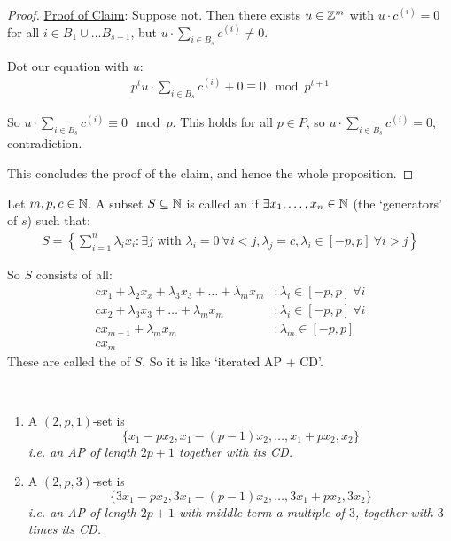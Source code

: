 \documentclass[10pt]{article}
\begin{document}
\begin{proof}
    \underline{Proof of Claim}: Suppose not. Then there exists $u \in \mathbb{Z}^m$ with $u\cdot c^{(i)} = 0$ for all $i \in B_1\cup\dots B_{s-1}$, but $u\cdot \sum_{i \in B_s}c^{(i)}\ne 0$.

    Dot our equation with $u$:
    \begin{align*}
        p^t u\cdot \sum_{i \in B_s}c^{(i)} + 0 \equiv 0\mod p^{t+1}
    \end{align*}

    So $u\cdot \sum_{i \in B_s}c^{(i)} \equiv 0 \mod p$. This holds for all $p \in P$, so $u\cdot \sum_{i \in B_s}c^{(i)} = 0$, contradiction.\qedsymbol

    This concludes the proof of the claim, and hence the whole proposition.
\end{proof}

\begin{defin*}[$(m,p,c)$-set]
    Let $m,p,c \in \mathbb{N}$. A subset $S \subseteq \mathbb{N}$ is called an  if $\exists x_1,\dots,x_n \in \mathbb{N}$ (the `generators' of $s$) such that:
    \begin{align*}
        S = \left\lbrace \sum_{i=1}^{n}\lambda_i x_i : \exists j\textrm{ with }\lambda_i = 0\ \forall i < j, \lambda _j = c, \lambda_i \in [-p,p]\ \forall i > j\right\rbrace
    \end{align*}

    So $S$ consists of all:
    \begin{align*}
        cx_1 + \lambda_2 x_x + \lambda_3 x_3+\dots + \lambda_m x_m&:\lambda_i\in[-p,p]\ \forall i\\
        cx_2 + \lambda_3x_3 +\dots + \lambda_m x_m &: \lambda_i \in [-p,p]\ \forall i\\
        cx_{m-1} + \lambda_m x_m &: \lambda_m \in [-p,p]\\
        cx_m &
    \end{align*}
    These are called the  of $S$. So it is like `iterated AP + CD'.
\end{defin*}

\begin{remark*}[Examples]\ 
    \begin{enumerate}
        \item A $(2,p,1)$-set is $$\{x_1-px_2,x_1-(p-1)x_2,\dots,x_1+px_2,x_2\}$$ \it{i.e.} an AP of length $2p+1$ together with its CD.
        \item A $(2,p,3)$-set is $$\{3x_1-px_2,3x_1-(p-1)x_2,\dots,3x_1+px_2,3x_2\}$$ \it{i.e.} an AP of length $2p+1$ with middle term a multiple of $3$, together with $3$ times its CD.
    \end{enumerate}
\end{remark*}
\end{document}
